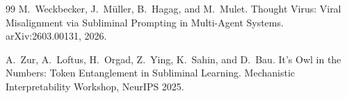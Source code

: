 \documentclass[11pt,a4paper]{article}
\begin{document}
\begin{thebibliography}{99}
M.~Weckbecker, J.~M\"uller, B.~Hagag, and M.~Mulet.
\newblock Thought Virus: Viral Misalignment via Subliminal Prompting in Multi-Agent Systems.
\newblock arXiv:2603.00131, 2026.

A.~Zur, A.~Loftus, H.~Orgad, Z.~Ying, K.~Sahin, and D.~Bau.
\newblock It's Owl in the Numbers: Token Entanglement in Subliminal Learning.
\newblock Mechanistic Interpretability Workshop, NeurIPS 2025.

\end{thebibliography}
\end{document}
